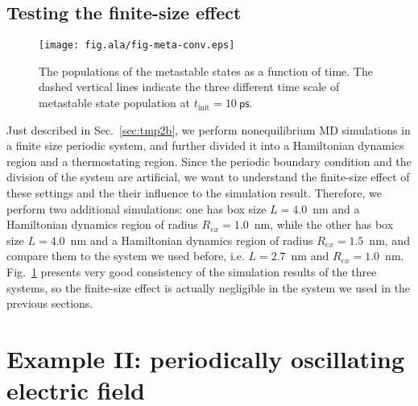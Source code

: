 \documentclass[a4paper,preprint,unsortedaddress,onecolumn]{revtex4-1}
\begin{document}


\subsection{Testing the finite-size effect}

\begin{figure}
  \centering
  \texttt{[image: fig.ala/fig-meta-conv.eps]}
  \caption{The populations of the metastable states as a function of time.
    The dashed vertical lines indicate the three different time scale of
  metastable state population at $t_{\textrm{init}} = 10~\textsf{ps}$.}
  \label{fig:tmp7}
\end{figure}

Just described in Sec.~\ref{sec:tmp2b}, we perform nonequilibrium MD
simulations in a finite size periodic system, and further divided it
into a Hamiltonian dynamics region and a thermostating region.
Since the periodic boundary condition and the division of the system
are artificial, 
we want to understand the finite-size effect of
these settings and the their influence to the simulation result.
Therefore, we
perform two additional simulations: one has box size $L=4.0$~nm and a
Hamiltonian dynamics region of radius $R_{ex} = 1.0$~nm, while the
other has box size $L=4.0$~nm and a Hamiltonian dynamics region of
radius $R_{ex} = 1.5$~nm, and compare them to the system
we used before, i.e. $L=2.7$~nm and $R_{ex} = 1.0$~nm.
Fig.~\ref{fig:tmp7} presents very good consistency of
the simulation results of the three systems, so the finite-size effect is
actually negligible in the system we used in the previous sections.



\section{Example II:
  periodically oscillating electric field}
\end{document}
